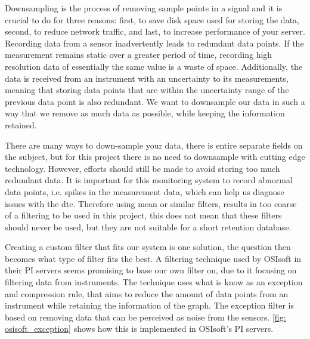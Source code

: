 \documentclass[main.tex]{subfiles}
\begin{document}
 Downsampling is the process of removing sample points in a signal and it is crucial to do for three reasons: first, to save disk space used for storing the data, second, to reduce network traffic, and last, to increase performance of your server. Recording data from a sensor inadvertently leads to redundant data points. If the measurement remains static over a greater period of time, recording high resolution data of essentially the same value is a waste of space. Additionally, the data is received from an instrument with an uncertainty to its measurements, meaning that storing data points that are within the uncertainty range of the previous data point is also redundant. We want to downsample our data in such a way that we remove as much data as possible, while keeping the information retained.
 
 There are many ways to down-sample your data, there is entire separate fields on the subject, but for this project there is no need to downsample with cutting edge technology. However, efforts should still be made to avoid storing too much redundant data. It is important for this monitoring system to record abnormal data points, i.e. spikes in the measurement data, which can help us diagnose issues with the \gls{dtc}. Therefore using mean or similar filters, results in too coarse of a filtering to be used in this project, this does not mean that these filters should never be used, but they are not suitable for a short retention database.
 
 Creating a custom filter that fits our system is one solution, the question then becomes what type of filter fits the best. A filtering technique used by OSIsoft in their PI servers seems promising to base our own filter on, due to it focusing on filtering data from instruments\cite{osisoft_exception}. The technique uses what is know as an exception and compression rule, that aims to reduce the amount of data points from an instrument while retaining the information of the graph. The exception filter is based on removing data that can be perceived as noise from the sensors. \autoref{fig: osisoft_exception} shows how this is implemented in OSIsoft's PI servers.
 
\end{document}
